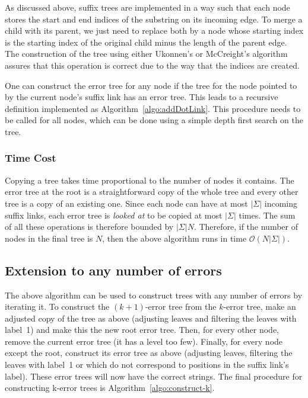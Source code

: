 As discussed above, suffix trees are implemented in a way such that each node stores the start and end indices of the substring on its incoming edge. To merge a child with its parent, we just need to replace both by a node whose starting index is the starting index of the original child minus the length of the parent edge. The construction of the tree using either Ukonnen's or McCreight's algorithm assures that this operation is correct due to the way that the indices are created.

One can construct the error tree for any node if the tree for the node pointed to by the current node's suffix link has an error tree. This leads to a recursive definition implemented as Algorithm~\ref{algo:addDotLink}. This procedure needs to be called for all nodes, which can be done using a simple depth first search on the tree.

\subsubsection*{Time Cost}

Copying a tree takes time proportional to the number of nodes it contains. The error tree at the root is a straightforward copy of the whole tree and every other tree is a copy of an existing one. Since each node can have at most $|\Sigma|$ incoming suffix links, each error tree is \emph{looked at\/} to be copied at most $|\Sigma|$ times. The sum of all these operations is therefore bounded by $|\Sigma|N$. Therefore, if the number of nodes in the final tree is $N$, then the above algorithm runs in time $\mathcal{O}(N|\Sigma|)$.

\subsection{Extension to any number of errors}\label{subsec:construct-k-larger-1}


The above algorithm can be used to construct trees with any number of errors by iterating it. To construct the $(k+1)$-error tree from the $k$-error tree, make an adjusted copy of the tree as above (adjusting leaves and filtering the leaves with label~1) and make this the new root error tree. Then, for every other node, remove the current error tree (it has a level too few). Finally, for every node except the root, construct its error tree as above (adjusting leaves, filtering the leaves with label~1 or which do not correspond to positions in the suffix link's label). These error trees will now have the correct strings. The final procedure for constructing k-error trees is Algorithm~\ref{algo:construct-k}.

